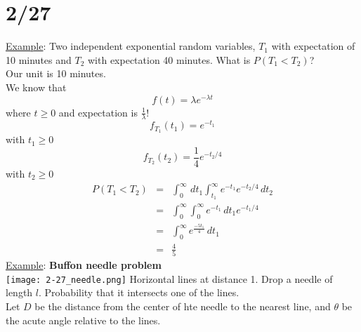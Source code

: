 \section*{2/27}
  \underline{Example}: Two independent exponential random variables, $T_1$
  with expectation of 10 minutes and $T_2$ with expectation 40 minutes.
  What is $P(T_1 < T_2)$?\\
  Our unit is 10 minutes.\\
  We know that 
  $$
    f(t) = \lambda e^{-\lambda t}
  $$
  where $t \ge 0$ and expectation is $\frac{1}{\lambda} !$
  $$
    f_{T_1}(t_1) = e^{-t_1}
  $$
  with $t_1 \ge 0$\\
  $$
    f_{T_2}(t_2) = \frac{1}{4}e^{-t_2/ 4}
  $$
  with $t_2 \ge 0$\\
  \begin{eqnarray*}
    P(T_1 < T_2) & = & \int_{0}^{\infty} \,dt_1 \int_{t_1}^{\infty} e^{-t_1} 
      e^{-t_2/ 4}\,dt_2\\
      & = & \int_{0}^{\infty} \int_{0}^{\infty} e^{-t_1} \,dt_1 
        e^{-t_1/ 4}\\
      & = & \int_0^{\infty}e^{\frac{-5t_1}{4}}\,dt_1\\
      & = & \frac{4}{5}
  \end{eqnarray*}
  \underline{Example}: {\bf Buffon needle problem}\\
    \texttt{[image: 2-27\_needle.png]}
    Horizontal lines at distance 1. Drop a needle of length $l$. Probability
    that it intersects one of the lines.\\

    \noindent Let $D$ be the distance from the center of hte needle to the
    nearest line, and $\theta$ be the acute angle relative to the lines.\\

